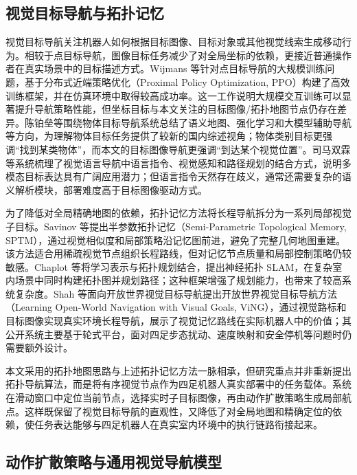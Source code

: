 \subsection{视觉目标导航与拓扑记忆}

视觉目标导航关注机器人如何根据目标图像、目标对象或其他视觉线索生成移动行为。相较于点目标导航，图像目标任务减少了对全局坐标的依赖，更接近普通操作者在真实场景中的目标描述方式。Wijmans 等\cite{ddppo2020}针对点目标导航的大规模训练问题，基于分布式近端策略优化（Proximal Policy Optimization, PPO）构建了高效训练框架，并在仿真环境中取得较高成功率。这一工作说明大规模交互训练可以显著提升导航策略性能，但坐标目标与本文关注的目标图像/拓扑地图节点仍存在差异。陈铂垒等\cite{chen2025object_nav_review}围绕物体目标导航系统总结了语义地图、强化学习和大模型辅助导航等方向，为理解物体目标任务提供了较新的国内综述视角；物体类别目标更强调“找到某类物体”，而本文的目标图像导航更强调“到达某个视觉位置”。司马双霖等\cite{sima2023vln_review}系统梳理了视觉语言导航中语言指令、视觉感知和路径规划的结合方式，说明多模态目标表达具有广阔应用潜力；但语言指令天然存在歧义，通常还需要复杂的语义解析模块，部署难度高于目标图像驱动方式。

为了降低对全局精确地图的依赖，拓扑记忆方法将长程导航拆分为一系列局部视觉子目标。Savinov 等\cite{savinov2018sptm}提出半参数拓扑记忆（Semi-Parametric Topological Memory, SPTM），通过视觉相似度和局部策略沿记忆图前进，避免了完整几何地图重建。该方法适合用稀疏视觉节点组织长程路线，但对记忆节点质量和局部控制策略仍较敏感。Chaplot 等\cite{chaplot2020nts}将学习表示与拓扑规划结合，提出神经拓扑 SLAM，在复杂室内场景中同时构建拓扑图并规划路径；这种框架增强了规划能力，也带来了较高系统复杂度。Shah 等\cite{shah2021ving}面向开放世界视觉目标导航提出开放世界视觉目标导航方法（Learning Open-World Navigation with Visual Goals, ViNG），通过视觉路标和目标图像实现真实环境长程导航，展示了视觉记忆路线在实际机器人中的价值；其公开系统主要基于轮式平台，面对四足步态扰动、速度映射和安全停机等问题时仍需要额外设计。

本文采用的拓扑地图思路与上述拓扑记忆方法一脉相承，但研究重点并非重新提出拓扑导航算法，而是将有序视觉节点作为四足机器人真实部署中的任务载体。系统在滑动窗口中定位当前节点，选择实时子目标图像，再由动作扩散策略生成局部航点。这样既保留了视觉目标导航的直观性，又降低了对全局地图和精确定位的依赖，使任务表达能够与四足机器人在真实室内环境中的执行链路衔接起来。

\subsection{动作扩散策略与通用视觉导航模型}

